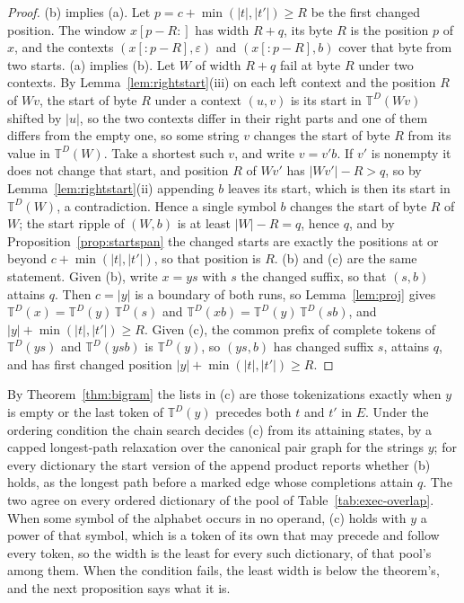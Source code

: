 \documentclass[11pt,a4paper]{article}
\theoremstyle{definition}
\theoremstyle{plain}
\newcommand{\T}{\mathbb{T}}
\begin{document}
\begin{proof}
(b) implies (a). Let \(p = c + \min(|t|, |t'|) \ge R\) be the first changed position. The window \(x[p - R{:}]\) has
width \(R + q\), its byte \(R\) is the position \(p\) of \(x\), and the contexts \((x[{:}p - R], \varepsilon)\) and
\((x[{:}p - R], b)\) cover that byte from two starts. (a) implies (b). Let \(W\) of width \(R + q\) fail at byte \(R\)
under two contexts. By Lemma~\ref{lem:rightstart}(iii) on each left context and the position \(R\) of \(Wv\), the start
of byte \(R\) under a context \((u, v)\) is its start in \(\T^D(Wv)\) shifted by \(|u|\), so the two contexts differ in
their right parts and one of them differs from the empty one, so some string \(v\) changes the start of byte \(R\) from
its value in \(\T^D(W)\). Take a shortest such \(v\), and write \(v = v'b\). If \(v'\) is nonempty it does not change
that start, and position \(R\) of \(Wv'\) has \(|Wv'| - R > q\), so by Lemma~\ref{lem:rightstart}(ii) appending \(b\)
leaves its start, which is then its start in \(\T^D(W)\), a contradiction. Hence a single symbol \(b\) changes the start
of byte \(R\) of \(W\); the start ripple of \((W, b)\) is at least \(|W| - R = q\), hence \(q\), and by
Proposition~\ref{prop:startspan} the changed starts are exactly the positions at or beyond \(c + \min(|t|, |t'|)\), so
that position is \(R\). (b) and (c) are the same statement. Given (b), write \(x = ys\) with \(s\) the changed suffix,
so that \((s, b)\) attains \(q\). Then \(c = |y|\) is a boundary of both runs, so Lemma~\ref{lem:proj} gives
\(\T^D(x) = \T^D(y)\,\T^D(s)\) and \(\T^D(xb) = \T^D(y)\,\T^D(sb)\), and \(|y| + \min(|t|, |t'|) \ge R\). Given (c), the
common prefix of complete tokens of \(\T^D(ys)\) and \(\T^D(ysb)\) is \(\T^D(y)\), so \((ys, b)\) has changed suffix
\(s\), attains \(q\), and has first changed position \(|y| + \min(|t|, |t'|) \ge R\).
\end{proof}

By Theorem~\ref{thm:bigram} the lists in (c) are those tokenizations exactly when \(y\) is empty or the last token of
\(\T^D(y)\) precedes both \(t\) and \(t'\) in \(E\). Under the ordering condition the chain search decides (c) from its
attaining states, by a capped longest-path relaxation over the canonical pair graph for the strings \(y\); for every
dictionary the start version of the append product reports whether (b) holds, as the longest path before a marked edge
whose completions attain \(q\). The two agree on every ordered dictionary of the pool of Table~\ref{tab:exec-overlap}.
When some symbol of the alphabet occurs in no operand, (c) holds with \(y\) a power of that symbol, which is a token of
its own that may precede and follow every token, so the width is the least for every such dictionary, \DensityInert{} of
that pool's among them. When the condition fails, the least width is below the theorem's, and the next proposition says
what it is.
\end{document}
